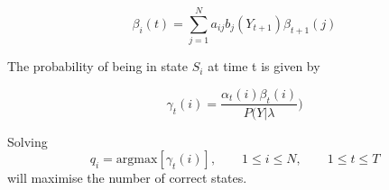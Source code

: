 \documentclass[12pt, a4paper, oneside]{article} %
\begin{document}
\begin{equation} 
\beta_i(t) = \sum_{j = 1}^N a_{ij}b_j(Y_{t+1})\beta_{t+1}(j)
\end{equation}

The probability of being in state $S_i$ at time t is given by 

\begin{equation}
\gamma_t(i) = \frac{\alpha_t(i)\beta_t(i)}{P(Y|\lambda})
\end{equation}

Solving
\begin{equation}
q_i = \text{argmax} [\gamma_t(i)], \qquad 1 \leq i \leq N, \qquad 1 \leq t \leq T  
\end{equation}
will maximise the number of correct states. 







\end{document}
